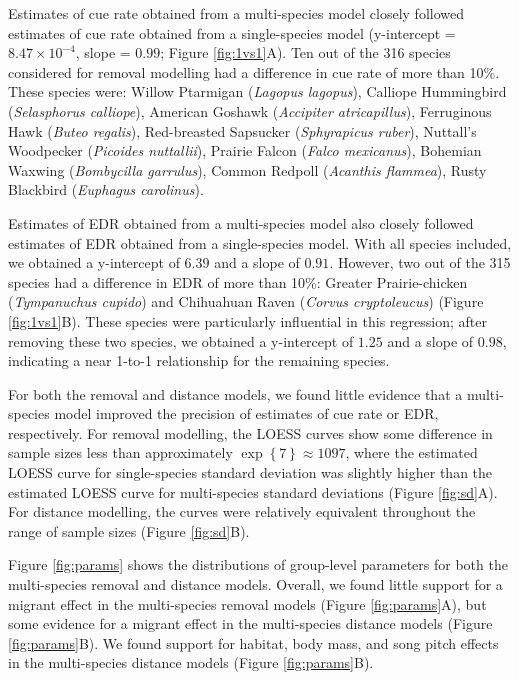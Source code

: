 \documentclass[12pt]{article}
\begin{document}
\par Estimates of cue rate obtained from a multi-species model closely followed estimates of cue rate obtained from a single-species model (y-intercept = $8.47 \times 10^{-4}$, slope = $0.99$; Figure \ref{fig:1vs1}A).
Ten out of the 316 species considered for removal modelling had a difference in cue rate of more than 10\%.
These species were: Willow Ptarmigan (\textit{Lagopus lagopus}), Calliope Hummingbird (\textit{Selasphorus calliope}), American Goshawk (\textit{Accipiter atricapillus}), Ferruginous Hawk (\textit{Buteo regalis}), Red-breasted Sapsucker (\textit{Sphyrapicus ruber}), Nuttall's Woodpecker (\textit{Picoides nuttallii}), Prairie Falcon (\textit{Falco mexicanus}), Bohemian Waxwing (\textit{Bombycilla garrulus}), Common Redpoll (\textit{Acanthis flammea}), Rusty Blackbird (\textit{Euphagus carolinus}).

\par Estimates of EDR obtained from a multi-species model also closely followed estimates of EDR obtained from a single-species model. 
With all species included, we obtained a y-intercept of $6.39$ and a slope of $0.91$.
However, two out of the 315 species had a difference in EDR of more than 10\%: Greater Prairie-chicken (\textit{Tympanuchus cupido}) and Chihuahuan Raven (\textit{Corvus cryptoleucus}) (Figure \ref{fig:1vs1}B).
These species were particularly influential in this regression; after removing these two species, we obtained a y-intercept of $1.25$ and a slope of $0.98$, indicating a near 1-to-1 relationship for the remaining species.

\par For both the removal and distance models, we found little evidence that a multi-species model improved the precision of estimates of cue rate or EDR, respectively.
For removal modelling, the LOESS curves show some difference in sample sizes less than approximately $\exp\left\{7\right\} \approx 1097$, where the estimated LOESS curve for single-species standard deviation was slightly higher than the estimated LOESS curve for multi-species standard deviations (Figure \ref{fig:sd}A).
For distance modelling, the curves were relatively equivalent throughout the range of sample sizes (Figure \ref{fig:sd}B).

\par Figure \ref{fig:params} shows the distributions of group-level parameters for both the multi-species removal and distance models. 
Overall, we found little support for a migrant effect in the multi-species removal models (Figure \ref{fig:params}A), but some evidence for a migrant effect in the multi-species distance models (Figure \ref{fig:params}B).
We found support for habitat, body mass, and song pitch effects in the multi-species distance models (Figure \ref{fig:params}B).
\end{document}

